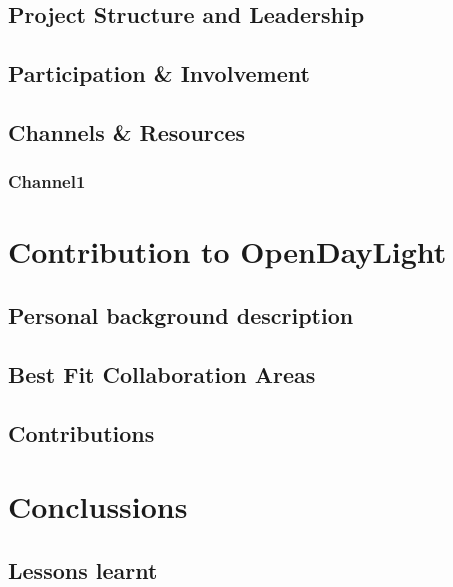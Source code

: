 \documentclass[a4paper, 12pt]{book}
\begin{document}
\section{Project Structure and Leadership}
\label{sec:od_structure}

\section{Participation \& Involvement}
\label{sec:od_participatiion}

\section{Channels \& Resources}
\label{sec:od_channels}

\subsection{Channel1}
\label{subsec:ob_channel1}


\chapter{Contribution to OpenDayLight}
\label{chap:contribution}

\section{Personal background description}
\label{sec:cont_background}

\section{Best Fit Collaboration Areas}
\label{sec:cont_bestfit}

\section{Contributions}
\label{sec:cont_contributions}


\chapter{Conclussions}
\label{chap:conclussions}

\section{Lessons learnt}
\label{sec:lessons}
\end{document}

